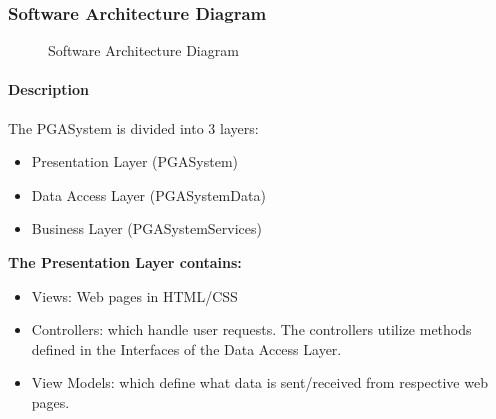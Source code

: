 \documentclass[11pt]{article}
\begin{document}
\subsubsection{Software Architecture Diagram}
\begin{figure}[H]
	\caption{Software Architecture Diagram}
\end{figure}
\paragraph{Description}\hfil\newline

The PGASystem is divided into 3 layers:
\begin{itemize}
	\item Presentation Layer (PGASystem)
	\item Data Access Layer (PGASystemData) 
	\item Business Layer (PGASystemServices)
\end{itemize}
\textbf{The Presentation Layer contains:}
\begin{itemize}
\item Views: Web pages in HTML/CSS
\item Controllers: which handle user requests. The controllers utilize methods defined in the Interfaces of the Data Access Layer.
\item View Models: which define what data is sent/received from respective web pages. 
\end{itemize}
\end{document}
